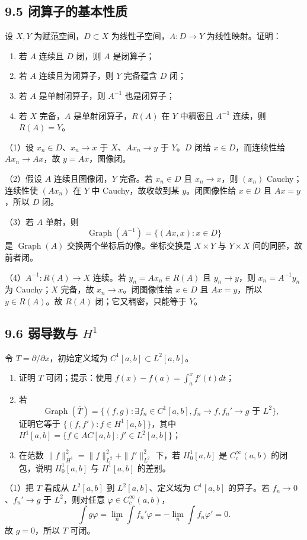 \subsection*{9.5 闭算子的基本性质}
\begin{problem}
设 $X,Y$ 为赋范空间，$D\subset X$ 为线性子空间，$A:D\to Y$ 为线性映射。证明：
\begin{enumerate}[label=(\arabic*)]
\item 若 $A$ 连续且 $D$ 闭，则 $A$ 是闭算子；
\item 若 $A$ 连续且为闭算子，则 $Y$ 完备蕴含 $D$ 闭；
\item 若 $A$ 是单射闭算子，则 $A^{-1}$ 也是闭算子；
\item 若 $X$ 完备，$A$ 是单射闭算子，$R(A)$ 在 $Y$ 中稠密且 $A^{-1}$ 连续，则 $R(A)=Y$。
\end{enumerate}
\end{problem}
（1）设 $x_n\in D$、$x_n\to x$ 于 $X$、$Ax_n\to y$ 于 $Y$。$D$ 闭给 $x\in D$，而连续性给 $Ax_n\to Ax$，故 $y=Ax$，图像闭。

（2）假设 $A$ 连续且图像闭，$Y$ 完备。若 $x_n\in D$ 且 $x_n\to x$，则 $(x_n)$ Cauchy；连续性使 $(Ax_n)$ 在 $Y$ 中 Cauchy，故收敛到某 $y$。闭图像性给 $x\in D$ 且 $Ax=y$，所以 $D$ 闭。

（3）若 $A$ 单射，则
\[
\operatorname{Graph}(A^{-1})=\{(Ax,x):x\in D\}
\]
是 $\operatorname{Graph}(A)$ 交换两个坐标后的像。坐标交换是 $X\times Y$ 与 $Y\times X$ 间的同胚，故前者闭。

（4）$A^{-1}:R(A)\to X$ 连续。若 $y_n=Ax_n\in R(A)$ 且 $y_n\to y$，则
$x_n=A^{-1}y_n$ 为 Cauchy；$X$ 完备，故 $x_n\to x$。闭图像性给 $x\in D$ 且 $Ax=y$，所以 $y\in R(A)$。故 $R(A)$ 闭；它又稠密，只能等于 $Y$。

\subsection*{9.6 弱导数与 $H^1$}
\begin{problem}
令 $T=\partial/\partial x$，初始定义域为 $C^1[a,b]\subset L^2[a,b]$。
\begin{enumerate}[label=(\arabic*)]
\item 证明 $T$ 可闭；提示：使用
$f(x)-f(a)=\int_a^xf'(t)dt$；
\item 若
\[
\operatorname{Graph}(\overline T)=
\{(f,g):\exists f_n\in C^1[a,b], f_n\to f, f_n'\to g\text{ 于 }L^2\},
\]
证明它等于 $\{(f,f'):f\in H^1[a,b]\}$，其中
$H^1[a,b]=\{f\in AC[a,b]:f'\in L^2[a,b]\}$；
\item 在范数 $\|f\|_{H^1}^2=\|f\|_{L^2}^2+\|f'\|_{L^2}^2$ 下，若
$H_0^1[a,b]$ 是 $C_c^\infty(a,b)$ 的闭包，说明 $H_0^1[a,b]$ 与 $H^1[a,b]$ 的差别。
\end{enumerate}
\end{problem}
（1）把 $T$ 看成从 $L^2[a,b]$ 到 $L^2[a,b]$、定义域为 $C^1[a,b]$ 的算子。若
$f_n\to0$、$f_n'\to g$ 于 $L^2$，则对任意 $\varphi\in C_c^\infty(a,b)$，
\[
\int g\varphi=\lim_n\int f_n'\varphi=-\lim_n\int f_n\varphi'=0.
\]
故 $g=0$，所以 $T$ 可闭。

